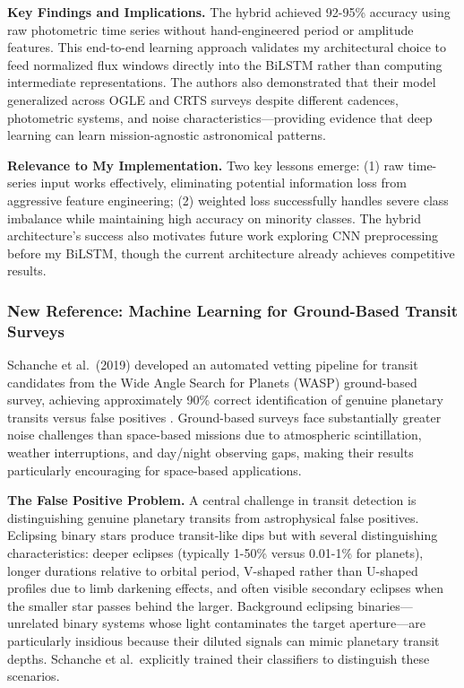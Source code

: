 \documentclass[letterpaper]{article} %
\begin{document}
\textbf{Key Findings and Implications.} The hybrid achieved 92-95\% accuracy using raw photometric time series without hand-engineered period or amplitude features. This end-to-end learning approach validates my architectural choice to feed normalized flux windows directly into the BiLSTM rather than computing intermediate representations. The authors also demonstrated that their model generalized across OGLE and CRTS surveys despite different cadences, photometric systems, and noise characteristics---providing evidence that deep learning can learn mission-agnostic astronomical patterns.

\textbf{Relevance to My Implementation.} Two key lessons emerge: (1) raw time-series input works effectively, eliminating potential information loss from aggressive feature engineering; (2) weighted loss successfully handles severe class imbalance while maintaining high accuracy on minority classes. The hybrid architecture's success also motivates future work exploring CNN preprocessing before my BiLSTM, though the current architecture already achieves competitive results.

\subsubsection{New Reference: Machine Learning for Ground-Based Transit Surveys}

Schanche et al.\ (2019) developed an automated vetting pipeline for transit candidates from the Wide Angle Search for Planets (WASP) ground-based survey, achieving approximately 90\% correct identification of genuine planetary transits versus false positives \cite{Schanche2019mlexoplanet}. Ground-based surveys face substantially greater noise challenges than space-based missions due to atmospheric scintillation, weather interruptions, and day/night observing gaps, making their results particularly encouraging for space-based applications.

\textbf{The False Positive Problem.} A central challenge in transit detection is distinguishing genuine planetary transits from astrophysical false positives. Eclipsing binary stars produce transit-like dips but with several distinguishing characteristics: deeper eclipses (typically 1-50\% versus 0.01-1\% for planets), longer durations relative to orbital period, V-shaped rather than U-shaped profiles due to limb darkening effects, and often visible secondary eclipses when the smaller star passes behind the larger. Background eclipsing binaries---unrelated binary systems whose light contaminates the target aperture---are particularly insidious because their diluted signals can mimic planetary transit depths. Schanche et al.\ explicitly trained their classifiers to distinguish these scenarios.
\end{document}

